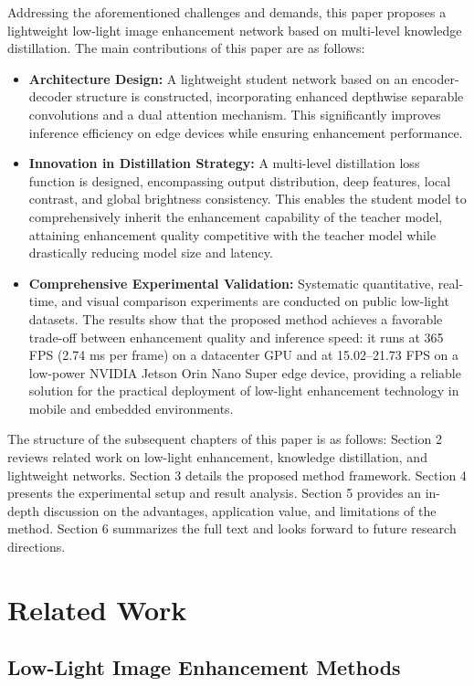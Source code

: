 \documentclass[sensors,article,submit,moreauthors]{Definitions/mdpi}
\begin{document}
Addressing the aforementioned challenges and demands, this paper proposes a lightweight low-light image enhancement network based on multi-level knowledge distillation. The main contributions of this paper are as follows:

\begin{itemize}
\item \textbf{Architecture Design:} A lightweight student network based on an encoder-decoder structure is constructed, incorporating enhanced depthwise separable convolutions and a dual attention mechanism. This significantly improves inference efficiency on edge devices while ensuring enhancement performance.
\item \textbf{Innovation in Distillation Strategy:} A multi-level distillation loss function is designed, encompassing output distribution, deep features, local contrast, and global brightness consistency. This enables the student model to comprehensively inherit the enhancement capability of the teacher model, attaining enhancement quality competitive with the teacher model while drastically reducing model size and latency.
\item \textbf{Comprehensive Experimental Validation:} Systematic quantitative, real-time, and visual comparison experiments are conducted on public low-light datasets. The results show that the proposed method achieves a favorable trade-off between enhancement quality and inference speed: it runs at 365 FPS (2.74 ms per frame) on a datacenter GPU and at 15.02--21.73 FPS on a low-power NVIDIA Jetson Orin Nano Super edge device, providing a reliable solution for the practical deployment of low-light enhancement technology in mobile and embedded environments.
\end{itemize}

The structure of the subsequent chapters of this paper is as follows: Section 2 reviews related work on low-light enhancement, knowledge distillation, and lightweight networks. Section 3 details the proposed method framework. Section 4 presents the experimental setup and result analysis. Section 5 provides an in-depth discussion on the advantages, application value, and limitations of the method. Section 6 summarizes the full text and looks forward to future research directions.

\section{Related Work}

\subsection{Low-Light Image Enhancement Methods}
\end{document}

